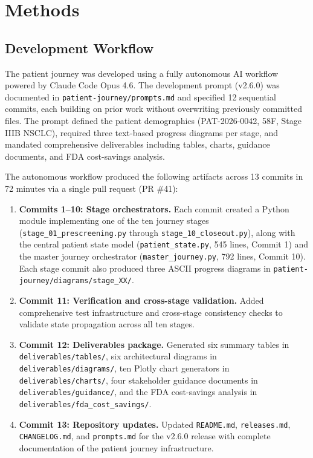 \documentclass{article}
\begin{document}
\section{Methods}
\label{sec:methods}

\vspace{-0.2cm}

\subsection{Development Workflow}
\label{sec:development-workflow}

The patient journey was developed using a fully autonomous AI workflow powered by Claude Code Opus 4.6. The development prompt (v2.6.0) was documented in \texttt{patient-journey/prompts.md} and specified 12 sequential commits, each building on prior work without overwriting previously committed files. The prompt defined the patient demographics (PAT-2026-0042, 58F, Stage IIIB NSCLC), required three text-based progress diagrams per stage, and mandated comprehensive deliverables including tables, charts, guidance documents, and FDA cost-savings analysis.

The autonomous workflow produced the following artifacts across 13 commits in 72 minutes via a single pull request (PR \#41):

\begin{enumerate}[leftmargin=*]
\item \textbf{Commits 1--10: Stage orchestrators.} Each commit created a Python module implementing one of the ten journey stages (\texttt{stage\_01\_prescreening.py} through \texttt{stage\_10\_closeout.py}), along with the central patient state model (\texttt{patient\_state.py}, 545 lines, Commit 1) and the master journey orchestrator (\texttt{master\_journey.py}, 792 lines, Commit 10). Each stage commit also produced three ASCII progress diagrams in \texttt{patient-journey/diagrams/stage\_XX/}.

\item \textbf{Commit 11: Verification and cross-stage validation.} Added comprehensive test infrastructure and cross-stage consistency checks to validate state propagation across all ten stages.

\item \textbf{Commit 12: Deliverables package.} Generated six summary tables in \texttt{deliverables/tables/}, six architectural diagrams in \texttt{deliverables/diagrams/}, ten Plotly chart generators in \texttt{deliverables/charts/}, four stakeholder guidance documents in \texttt{deliverables/guidance/}, and the FDA cost-savings analysis in \texttt{deliverables/fda\_cost\_savings/}.

\item \textbf{Commit 13: Repository updates.} Updated \texttt{README.md}, \texttt{releases.md}, \texttt{CHANGELOG.md}, and \texttt{prompts.md} for the v2.6.0 release with complete documentation of the patient journey infrastructure.
\end{enumerate}
\end{document}
